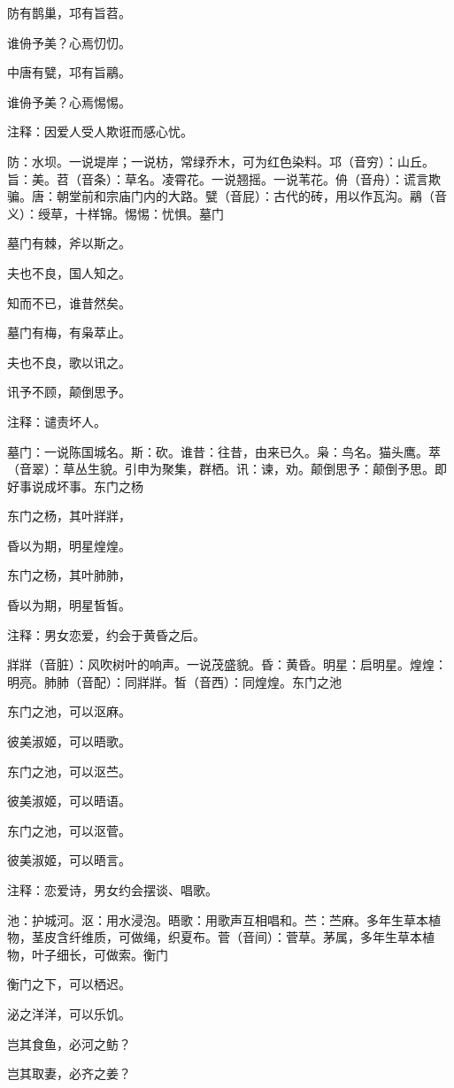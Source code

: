 \documentclass[12pt,UTF8]{ctexbook}
\begin{document}
防有鹊巢，邛有旨苕。

谁侜予美？心焉忉忉。

中唐有甓，邛有旨鷊。

谁侜予美？心焉惕惕。

注释：因爱人受人欺诳而感心忧。

防：水坝。一说堤岸；一说枋，常绿乔木，可为红色染料。邛（音穷）：山丘。旨：美。苕（音条）：草名。凌霄花。一说翘摇。一说苇花。侜（音舟）：谎言欺骗。唐：朝堂前和宗庙门内的大路。甓（音屁）：古代的砖，用以作瓦沟。鷊（音义）：绶草，十样锦。惕惕：忧惧。墓门

墓门有棘，斧以斯之。

夫也不良，国人知之。

知而不已，谁昔然矣。

墓门有梅，有枭萃止。

夫也不良，歌以讯之。

讯予不顾，颠倒思予。

注释：谴责坏人。

墓门：一说陈国城名。斯：砍。谁昔：往昔，由来已久。枭：鸟名。猫头鹰。萃（音翠）：草丛生貌。引申为聚集，群栖。讯：谏，劝。颠倒思予：颠倒予思。即好事说成坏事。东门之杨

东门之杨，其叶牂牂，

昏以为期，明星煌煌。

东门之杨，其叶肺肺，

昏以为期，明星皙皙。

注释：男女恋爱，约会于黄昏之后。

牂牂（音脏）：风吹树叶的响声。一说茂盛貌。昏：黄昏。明星：启明星。煌煌：明亮。肺肺（音配）：同牂牂。皙（音西）：同煌煌。东门之池

东门之池，可以沤麻。

彼美淑姬，可以晤歌。

东门之池，可以沤苎。

彼美淑姬，可以晤语。

东门之池，可以沤菅。

彼美淑姬，可以晤言。

注释：恋爱诗，男女约会摆谈、唱歌。

池：护城河。沤：用水浸泡。晤歌：用歌声互相唱和。苎：苎麻。多年生草本植物，茎皮含纤维质，可做绳，织夏布。菅（音间）：菅草。茅属，多年生草本植物，叶子细长，可做索。衡门

衡门之下，可以栖迟。

泌之洋洋，可以乐饥。

岂其食鱼，必河之鲂？

岂其取妻，必齐之姜？
\end{document}
